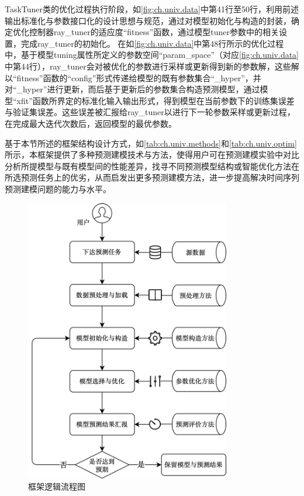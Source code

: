 TaskTuner类的优化过程执行阶段，如\autoref{fig:ch.univ.data}中第41行至50行，利用前述输出标准化与参数接口化的设计思想与规范，通过对模型初始化与构造的封装，确定优化控制器ray_tuner的适应度“fitness”函数，通过模型tuner参数中的相关设置，完成ray_tuner的初始化。
在如\autoref{fig:ch.univ.data}中第48行所示的优化过程中，基于模型tuning属性所定义的参数空间“param_space”（对应\autoref{fig:ch.univ.data}中第44行），ray_tuner会对被优化的参数进行采样或更新得到新的参数解，这些解以“fitness”函数的“config”形式传递给模型的既有参数集合“_hyper”，并对“_hyper”进行更新，而后基于更新后的参数集合构造预测模型，通过模型“xfit”函数所界定的标准化输入输出形式，得到模型在当前参数下的训练集误差与验证集误差。这些误差被汇报给ray_tuner以进行下一轮参数采样或更新过程，在完成最大迭代次数后，返回模型的最优参数。

基于本节所述的框架结构设计方式，如\autoref{tab:ch.univ.methods}和\autoref{tab:ch.univ.optim}所示，本框架提供了多种预测建模技术与方法，使得用户可在预测建模实验中对比分析所提模型与既有模型间的性能差异，找寻不同预测模型结构或智能优化方法在所选预测任务上的优劣，从而启发出更多预测建模方法，进一步提高解决时间序列预测建模问题的能力与水平。

\begin{figure}[t!]
    \centering
    \includegraphics[width=0.8\textwidth]{float/ch.univ/flow.png}
    \caption{框架逻辑流程图\label{fig:ch.univ.flow}}
\end{figure}
